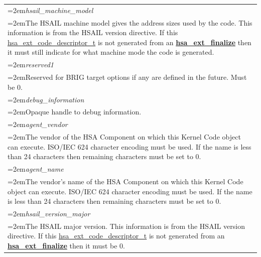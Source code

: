 \documentclass[final,oneside]{book}
\newcommand{\reffun}[1]{\textbf{#1}}
\newcommand{\reffld}[1]{\textit{#1}}
\begin{document}
\begin{longtable}{@{}>{\hangindent=2em}p{\textwidth}}
\hypertarget{hsa_\-ext_\-code_\-descriptor_\-t.hsail_\-machine_\-model}{\reffld{hsail_\-machine_\-model}}\\\hspace{2em}The HSAIL machine model gives the address sizes used by the code. This information is from the HSAIL version directive. If this \hyperlink{group__ext-finalizer_1ga0e01eabc57d7105ea37e1abbb50fa337}{hsa_\-ext_\-code_\-descriptor_\-t} is not generated from an \hyperlink{group__ext-finalizer_1ga1e316cdba4ac2ce42f17866aa2e9250d}{\reffun{hsa_\-ext_\-finalize}} then it must still indicate for what machine mode the code is generated.\\[2mm]
\hypertarget{hsa_\-ext_\-code_\-descriptor_\-t.reserved1}{\reffld{reserved1}}\\\hspace{2em}Reserved for BRIG target options if any are defined in the future. Must be 0.\\[2mm]
\hypertarget{hsa_\-ext_\-code_\-descriptor_\-t.debug_\-information}{\reffld{debug_\-information}}\\\hspace{2em}Opaque handle to debug information.\\[2mm]
\hypertarget{hsa_\-ext_\-code_\-descriptor_\-t.agent_\-vendor}{\reffld{agent_\-vendor}}\\\hspace{2em}The vendor of the HSA Component on which this Kernel Code object can execute. ISO/IEC 624 character encoding must be used. If the name is less than 24 characters then remaining characters must be set to 0.\\[2mm]
\hypertarget{hsa_\-ext_\-code_\-descriptor_\-t.agent_\-name}{\reffld{agent_\-name}}\\\hspace{2em}The vendor's name of the HSA Component on which this Kernel Code object can execute. ISO/IEC 624 character encoding must be used. If the name is less than 24 characters then remaining characters must be set to 0.\\[2mm]
\hypertarget{hsa_\-ext_\-code_\-descriptor_\-t.hsail_\-version_\-major}{\reffld{hsail_\-version_\-major}}\\\hspace{2em}The HSAIL major version. This information is from the HSAIL version directive. If this \hyperlink{group__ext-finalizer_1ga0e01eabc57d7105ea37e1abbb50fa337}{hsa_\-ext_\-code_\-descriptor_\-t} is not generated from an \hyperlink{group__ext-finalizer_1ga1e316cdba4ac2ce42f17866aa2e9250d}{\reffun{hsa_\-ext_\-finalize}} then it must be 0.\\[2mm]

\end{longtable}
\end{document}
